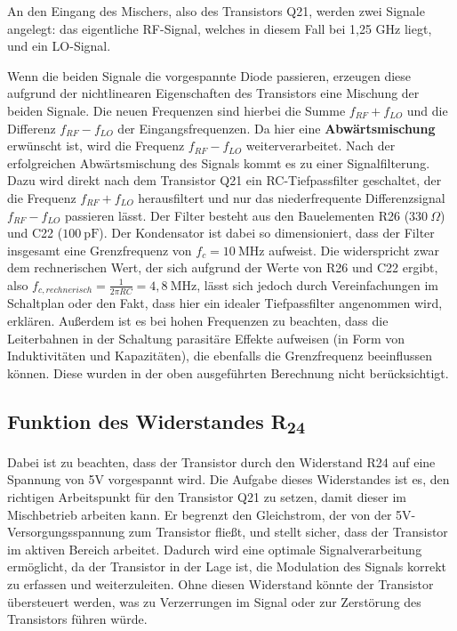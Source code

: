 An den Eingang des Mischers, also des Transistors Q21, werden zwei Signale angelegt: das eigentliche \ac{RF}-Signal, welches in diesem Fall bei 1,25 GHz liegt, und ein \ac{LO}-Signal.

Wenn die beiden Signale die vorgespannte Diode passieren, erzeugen diese aufgrund der nichtlinearen Eigenschaften des Transistors eine Mischung der beiden Signale. Die neuen Frequenzen sind hierbei die Summe $f_{RF} + f_{LO}$ und die Differenz $f_{RF} - f_{LO}$ der Eingangsfrequenzen. 
Da hier eine \textbf{Abwärtsmischung} erwünscht ist, wird die Frequenz $f_{RF} - f_{LO}$ weiterverarbeitet. 
Nach der erfolgreichen Abwärtsmischung des Signals kommt es zu einer Signalfilterung. Dazu wird direkt nach dem Transistor Q21 ein RC-Tiefpassfilter geschaltet, der die Frequenz $f_{RF} + f_{LO}$ herausfiltert und nur das niederfrequente Differenzsignal $f_{RF} - f_{LO}$ passieren lässt. Der Filter besteht aus den Bauelementen R26 ($330~\Omega$) und C22 ($100~\mathrm{pF}$). Der Kondensator ist dabei so dimensioniert, dass der Filter insgesamt eine Grenzfrequenz von $f_{c} = 10~\mathrm{MHz}$ aufweist. Die widerspricht zwar dem rechnerischen Wert, der sich aufgrund der Werte von R26 und C22 ergibt, also $f_{c, rechnerisch} = \frac{1}{2\pi R C} = 4,8~\mathrm{MHz}$, lässt sich jedoch durch Vereinfachungen im Schaltplan oder den Fakt, dass hier ein idealer Tiefpassfilter angenommen wird, erklären. Außerdem ist es bei hohen Frequenzen zu beachten, dass die Leiterbahnen in der Schaltung parasitäre Effekte aufweisen (in Form von Induktivitäten und Kapazitäten), die ebenfalls die Grenzfrequenz beeinflussen können. Diese wurden in der oben ausgeführten Berechnung nicht berücksichtigt.

\subsection{Funktion des Widerstandes R\textsubscript{24}}
Dabei ist zu beachten, dass der Transistor durch den Widerstand R24 auf eine Spannung von 5V vorgespannt wird. Die Aufgabe dieses Widerstandes ist es, den richtigen Arbeitspunkt für den Transistor Q21 zu setzen, damit dieser im Mischbetrieb arbeiten kann. Er begrenzt den Gleichstrom, der von der 5V-Versorgungsspannung zum Transistor fließt, und stellt sicher, dass der Transistor im aktiven Bereich arbeitet. Dadurch wird eine optimale Signalverarbeitung ermöglicht, da der Transistor in der Lage ist, die Modulation des Signals korrekt zu erfassen und weiterzuleiten. Ohne diesen Widerstand könnte der Transistor übersteuert werden, was zu Verzerrungen im Signal oder zur Zerstörung des Transistors führen würde.


